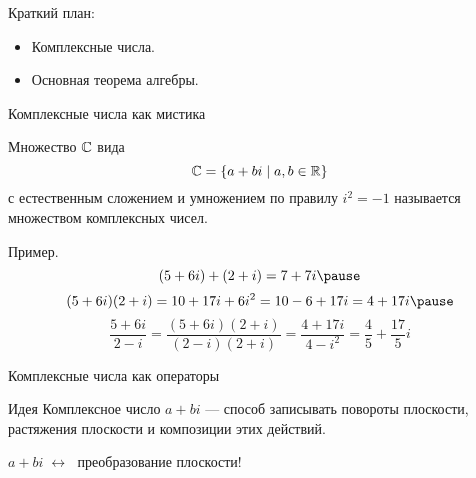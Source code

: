 
\begin{frame} %


\end{frame}



\begin{frame}{Краткий план:}
  \begin{itemize}[<+->] 
    \item Комплексные числа.
    \item Основная теорема алгебры.
  \end{itemize}

\end{frame}



\begin{frame}{Комплексные числа как мистика}

    \begin{block}{}
        Множество $\mathbb{C}$ вида
        \[
        \mathbb{C} = \{ a+ bi \mid a, b \in \mathbb{R} \}    
        \]
        с естественным сложением и умножением по правилу $i^2 = -1$ называется множеством \alert{комплексных чисел}.
    \end{block}

    \pause
    Пример.
    \[
    (5 + 6i) + (2 + i) = 7 + 7i \pause 
    \]
    \[
        (5 + 6i)(2+i) = 10 + 17i + 6i^2 = 10 - 6 + 17i = 4 + 17i \pause    
    \]
    \[
    \frac{5+6i}{2-i } =     \frac{(5+6i)(2+i)}{(2-i)(2+i)} = \frac{4+17i}{4 - i^2}= \frac{4}{5} + \frac{17}{5}i
    \]

\end{frame}

\begin{frame}{Комплексные числа как операторы}

    \begin{block}{Идея}
    Комплексное число $a + bi$ — способ записывать повороты плоскости,
    растяжения плоскости и композиции этих действий.    
    \end{block}

    \pause
    $a+ bi \; \leftrightarrow \;$ преобразование плоскости! 

\end{frame}


